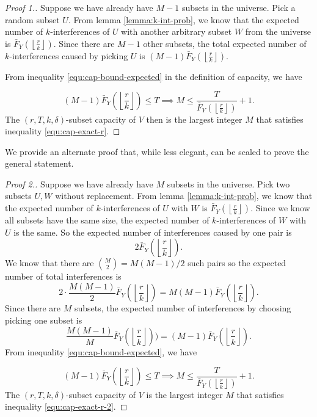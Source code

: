     \begin{proof}[Proof 1.]
         Suppose we have already have $M-1$ subsets in the universe. Pick a random subset $U$. From lemma \ref{lemma:k-int-prob}, we know that the expected number of $k$-interferences of $U$  with another arbitrary subset $W$ from the universe is $\bar{F}_Y\left(\left\lfloor \frac{r}{k} \right\rfloor\right)$. Since there are $M-1$ other subsets, the total expected number of $k$-interferences caused by picking $U$ is $(M-1) \bar{F}_Y\left(\left\lfloor \frac{r}{k} \right\rfloor\right)$.

        From inequality \ref{equ:cap-bound-expected} in the definition of capacity, we have 
        
            \begin{equation}
            \label{equ:cap-exact-r}
                (M-1) \bar{F}_Y\left(\left\lfloor \frac{r}{k} \right\rfloor\right) \le T \implies M \le \frac{T}{\bar{F}_Y\left(\left\lfloor \frac{r}{k} \right\rfloor\right)} + 1.
            \end{equation}
            The $(r,T,k,\delta)$-subset capacity of $V$ then is the largest integer $M$ that satisfies inequality \ref{equ:cap-exact-r}.
    \end{proof}

    We provide an alternate proof that, while less elegant, can be scaled to prove the general statement. 

    \begin{proof}[Proof 2.]
        Suppose we have already have $M$ subsets in the universe. Pick two subsets $U,W$ without replacement. From lemma \ref{lemma:k-int-prob}, we know that the expected number of $k$-interferences of $U$ with $W$ is $\bar{F}_Y\left(\left\lfloor \frac{r}{k} \right\rfloor\right)$. Since we know all subsets have the same size, the expected number of $k$-interferences of $W$ with $U$ is the same. So the expected number of interferences caused by one pair is
    $$
    2\bar{F}_Y\left(\left\lfloor \frac{r}{k} \right\rfloor\right).
    $$
    We know that there are $\binom{M}{2} = M(M-1)/2$ such pairs so the expected number of total interferences is
    $$
    2 \cdot \frac{M(M-1)}{2} \bar{F}_Y\left(\left\lfloor \frac{r}{k} \right\rfloor\right)  =  M(M-1) \bar{F}_Y\left(\left\lfloor \frac{r}{k} \right\rfloor\right). 
    $$
    Since there are $M$ subsets, the expected number of interferences by choosing picking one subset is
    $$
    \frac{M(M-1)}{M} \bar{F}_Y\left(\left\lfloor \frac{r}{k} \right\rfloor\right))  = (M-1) \bar{F}_Y\left(\left\lfloor \frac{r}{k} \right\rfloor\right).
    $$
    From inequality \ref{equ:cap-bound-expected}, we have 

    \begin{equation}
        \label{equ:cap-exact-r-2}
        (M-1) \bar{F}_Y\left(\left\lfloor \frac{r}{k} \right\rfloor\right) \le T \implies M \le \frac{T}{\bar{F}_Y\left(\left\lfloor \frac{r}{k} \right\rfloor\right)} + 1.
    \end{equation}
The $(r,T,k,\delta)$-subset capacity of $V$ is the largest integer $M$ that satisfies inequality \ref{equ:cap-exact-r-2}.
    \end{proof}

